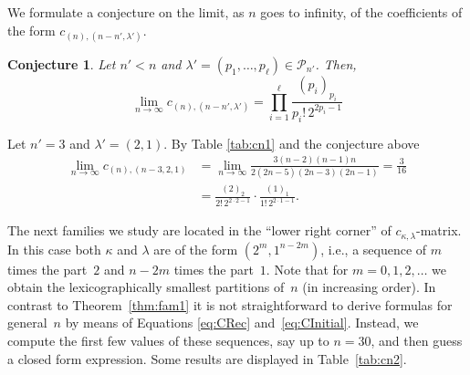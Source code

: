 \documentclass[smallextended]{svjour3}
\newtheorem{conj}[thm]{Conjecture}
\begin{document}
We formulate a conjecture on the limit, as $n$ goes to infinity,
of the coefficients of the form $c_{(n),(n-n',\lambda')}$.

\begin{conj}
Let $n'<n$ and $\lambda'=(p_1,\ldots,p_\ell)\in\mathcal{P}_{n'}$. Then, 
\[
\lim_{n\to\infty} c_{(n),(n-n',\lambda') }=\prod_{i=1}^{\ell} \frac{(p_i)_{p_i}}{p_i! \, 2^{2p_i-1}}
\]
\end{conj}

\begin{example}
Let $n'=3$ and $\lambda'=(2,1)$. By Table \ref{tab:cn1} and the conjecture above
\begin{align*}
  \lim_{n\rightarrow\infty}c_{(n),(n-3,2,1)} &=
  \lim_{n\rightarrow\infty}\frac{3(n-2)(n-1)n}{2(2n-5)(2n-3)(2n-1)}=\frac{3}{16} \\
  &= \frac{(2)_2}{2! \, 2^{2\cdot 2-1}}\cdot\frac{(1)_1}{1! \, 2^{2\cdot 1-1}}.
\end{align*}
\end{example}

The next families we study are located in the ``lower right corner'' of
$c_{\kappa,\lambda}$-matrix. In this case both $\kappa$ and $\lambda$ are of
the form $(2^m,1^{n-2m})$, i.e., a sequence of $m$ times the part~$2$ and
$n-2m$ times the part~$1$. Note that for $m=0,1,2,\dots$ we obtain the
lexicographically smallest partitions of~$n$ (in increasing order).  In
contrast to Theorem~\ref{thm:fam1} it is not straightforward to derive
formulas for general~$n$ by means of Equations \eqref{eq:CRec}
and~\eqref{eq:CInitial}. Instead, we compute the first few values of these
sequences, say up to $n=30$, and then guess a closed form expression.
Some results are displayed in Table~\ref{tab:cn2}.
\end{document}
